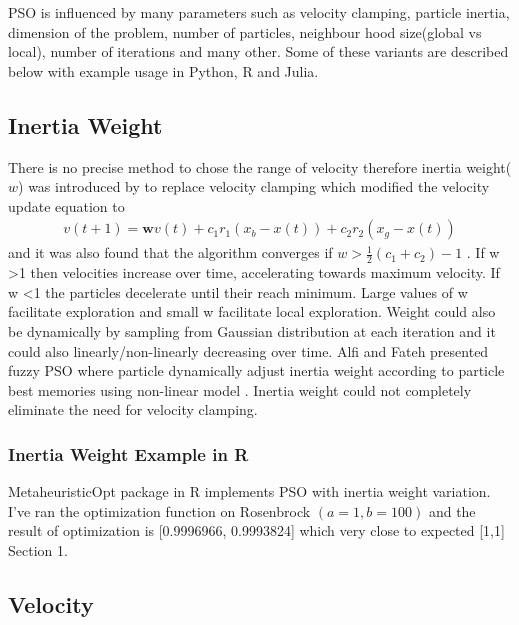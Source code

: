 \documentclass{article}
\begin{document}
PSO is influenced by many parameters such as velocity clamping, particle inertia, dimension of the problem, number of particles, neighbour hood size(global vs local), number of iterations and many other. Some of these variants are described below with example usage in Python, R and Julia.


\subsection{Inertia Weight}
There is no precise method to chose the range of velocity therefore inertia weight($w$) was introduced by \cite{shi1998modified} to replace velocity clamping which modified the velocity update equation to  
\begin{align*} v(t+1) = \boldsymbol{w} v(t) + c_1r_1(x_b - x(t)) + c_2r_2(x_g - x(t))
\end{align*} and it was also found that the algorithm converges if $w > \frac{1}{2}(c_1 + c_2) - 1$ \cite{van2007analysis}. If w \textgreater 1 then velocities increase over time, accelerating towards maximum velocity. If w \textless 1 the particles decelerate until their reach minimum. Large values of w facilitate exploration and small w facilitate local exploration. Weight could also be dynamically by sampling from Gaussian distribution at each iteration and it could also linearly/non-linearly decreasing over time. Alfi and Fateh presented fuzzy PSO where particle dynamically adjust inertia weight according to particle best memories using non-linear model \cite{alfi2011intelligent}. Inertia weight could not completely eliminate the need for velocity clamping.

\subsubsection{Inertia Weight Example in R}
MetaheuristicOpt package in R implements PSO with inertia weight variation. I've ran the optimization function on Rosenbrock $(a =1, b=100)$ and the result of optimization is [0.9996966, 0.9993824] which very close to expected [1,1] \cite{irfan_2021R} Section 1.

\subsection{Velocity}
\end{document}
